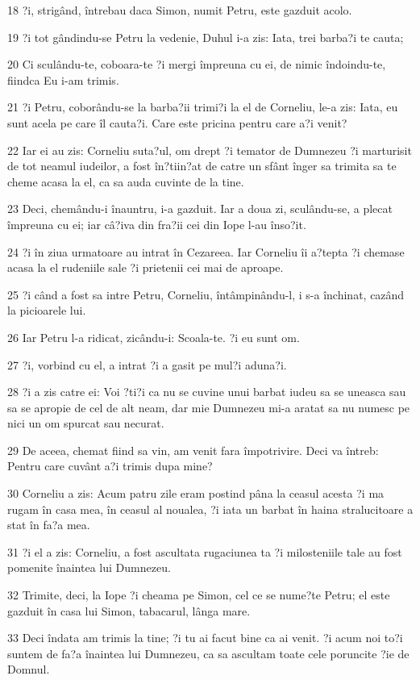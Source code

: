\par 18 ?i, strigând, întrebau daca Simon, numit Petru, este gazduit acolo.
\par 19 ?i tot gândindu-se Petru la vedenie, Duhul i-a zis: Iata, trei barba?i te cauta;
\par 20 Ci sculându-te, coboara-te ?i mergi împreuna cu ei, de nimic îndoindu-te, fiindca Eu i-am trimis.
\par 21 ?i Petru, coborându-se la barba?ii trimi?i la el de Corneliu, le-a zis: Iata, eu sunt acela pe care îl cauta?i. Care este pricina pentru care a?i venit?
\par 22 Iar ei au zis: Corneliu suta?ul, om drept ?i temator de Dumnezeu ?i marturisit de tot neamul iudeilor, a fost în?tiin?at de catre un sfânt înger sa trimita sa te cheme acasa la el, ca sa auda cuvinte de la tine.
\par 23 Deci, chemându-i înauntru, i-a gazduit. Iar a doua zi, sculându-se, a plecat împreuna cu ei; iar câ?iva din fra?ii cei din Iope l-au înso?it.
\par 24 ?i în ziua urmatoare au intrat în Cezareea. Iar Corneliu îi a?tepta ?i chemase acasa la el rudeniile sale ?i prietenii cei mai de aproape.
\par 25 ?i când a fost sa intre Petru, Corneliu, întâmpinându-l, i s-a închinat, cazând la picioarele lui.
\par 26 Iar Petru l-a ridicat, zicându-i: Scoala-te. ?i eu sunt om.
\par 27 ?i, vorbind cu el, a intrat ?i a gasit pe mul?i aduna?i.
\par 28 ?i a zis catre ei: Voi ?ti?i ca nu se cuvine unui barbat iudeu sa se uneasca sau sa se apropie de cel de alt neam, dar mie Dumnezeu mi-a aratat sa nu numesc pe nici un om spurcat sau necurat.
\par 29 De aceea, chemat fiind sa vin, am venit fara împotrivire. Deci va întreb: Pentru care cuvânt a?i trimis dupa mine?
\par 30 Corneliu a zis: Acum patru zile eram postind pâna la ceasul acesta ?i ma rugam în casa mea, în ceasul al noualea, ?i iata un barbat în haina stralucitoare a stat în fa?a mea.
\par 31 ?i el a zis: Corneliu, a fost ascultata rugaciunea ta ?i milosteniile tale au fost pomenite înaintea lui Dumnezeu.
\par 32 Trimite, deci, la Iope ?i cheama pe Simon, cel ce se nume?te Petru; el este gazduit în casa lui Simon, tabacarul, lânga mare.
\par 33 Deci îndata am trimis la tine; ?i tu ai facut bine ca ai venit. ?i acum noi to?i suntem de fa?a înaintea lui Dumnezeu, ca sa ascultam toate cele poruncite ?ie de Domnul.

